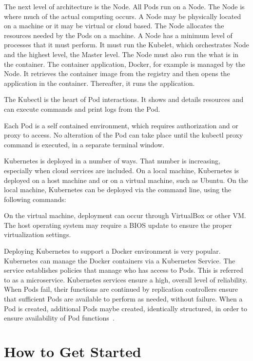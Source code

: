 The next level of architecture is the Node.  All Pods run on a Node.
The Node is where much of the actual computing occurs.  A Node may be
physically located on a machine or it may be virtual or cloud
based. The Node allocates the resources needed by the Pods on a
machine.  A Node has a minimum level of processes that it must
perform.  It must run the Kubelet, which orchestrates Node and the
highest level, the Master level.  The Node must also run the what is
in the container.  The container application, Docker, for example is
managed by the Node.  It retrieves the container image from the
registry and then opens the application in the container.  Thereafter,
it runs the application. 

The Kubectl is the heart of Pod interactions.  It shows and details
resources and can execute commands and print logs from the Pod. 

Each Pod is a self contained environment, which requires authorization
and or proxy to access.  No alteration of the Pod can take place until
the kubectl proxy command is executed, in a separate terminal window.   
 


Kubernetes is deployed in a number of ways.  That number is
increasing, especially when cloud services are included.  On a local
machine, Kubernetes is deployed on a host machine and or on a virtual
machine, such as Ubuntu.  On the local machine, Kubernetes can be
deployed via the command line, using the following commands: 


On the virtual machine, deployment can occur through VirtualBox or
other VM.  The host operating system may require a BIOS update to
ensure the proper virtualization settings.   

Deploying Kubernetes to support a Docker environment is very popular.
Kubernetes can manage the Docker containers via a Kubernetes Service.
The service establishes policies that manage who has access to Pods.
This is referred to as a microservice.  Kubernetes services ensure a
high, overall level of reliability.  When Pods fail, their functions
are continued by replication controllers ensure that sufficient Pods
are available to perform as needed, without failure.  When a Pod is
created, additional Pods maybe created, identically structured, in
order to ensure availability of Pod functions~\cite{hid-sp18-525-service}.  

\section{How to Get Started}

